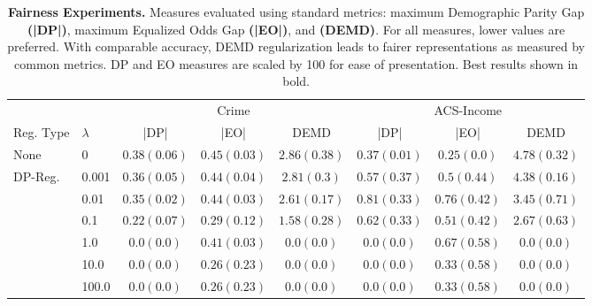 \begin{table*}
	\scriptsize
	\setlength\tabcolsep{10pt} %
	\caption{\footnotesize \textbf{Fairness Experiments.} Measures evaluated using standard metrics: maximum Demographic Parity Gap \textbf{(|DP|)},  maximum Equalized Odds Gap \textbf{(|EO|)}, and \textbf{(DEMD)}. For all measures, lower values are preferred.  With comparable accuracy, DEMD regularization leads to fairer representations as measured by common metrics. DP and EO measures are scaled by 100 for ease of presentation. Best results shown in bold.}
	\begin{tabular*}{\linewidth}{ll| *{3}{c}|*{3}{c}}
		\midrule%
		& & \multicolumn{3}{c}{Crime} & \multicolumn{3}{c}{ACS-Income} \\
		\cmidrule{3-5} \cmidrule{6-8}
		Reg. Type & $\lambda$ & |DP| & |EO| & DEMD & |DP| & |EO| & DEMD \\ 
		\midrule
		None & 0 & $0.38\scriptscriptstyle(0.06)$ & $0.45\scriptscriptstyle(0.03)$ & $2.86\scriptscriptstyle(0.38)$ & $0.37\scriptscriptstyle(0.01)$ & $0.25\scriptscriptstyle(0.0)$ & $4.78\scriptscriptstyle(0.32)$ \\
\midrule
DP-Reg. & 0.001 & $0.36\scriptscriptstyle(0.05)$ & $0.44\scriptscriptstyle(0.04)$ & $2.81\scriptscriptstyle(0.3)$ & $0.57\scriptscriptstyle(0.37)$ & $0.5\scriptscriptstyle(0.44)$ & $4.38\scriptscriptstyle(0.16)$ \\
	 & 0.01 & $0.35\scriptscriptstyle(0.02)$ & $0.44\scriptscriptstyle(0.03)$ & $2.61\scriptscriptstyle(0.17)$ & $0.81\scriptscriptstyle(0.33)$ & $0.76\scriptscriptstyle(0.42)$ & $3.45\scriptscriptstyle(0.71)$ \\
	 & 0.1 & $0.22\scriptscriptstyle(0.07)$ & $0.29\scriptscriptstyle(0.12)$ & $1.58\scriptscriptstyle(0.28)$ & $0.62\scriptscriptstyle(0.33)$ & $0.51\scriptscriptstyle(0.42)$ & $2.67\scriptscriptstyle(0.63)$ \\
	 & 1.0 & $0.0\scriptscriptstyle(0.0)$ & $0.41\scriptscriptstyle(0.03)$ & $0.0\scriptscriptstyle(0.0)$ & $0.0\scriptscriptstyle(0.0)$ & $0.67\scriptscriptstyle(0.58)$ & $0.0\scriptscriptstyle(0.0)$ \\
	 & 10.0 & $0.0\scriptscriptstyle(0.0)$ & $0.26\scriptscriptstyle(0.23)$ & $0.0\scriptscriptstyle(0.0)$ & $0.0\scriptscriptstyle(0.0)$ & $0.33\scriptscriptstyle(0.58)$ & $0.0\scriptscriptstyle(0.0)$ \\
	 & 100.0 & $0.0\scriptscriptstyle(0.0)$ & $0.26\scriptscriptstyle(0.23)$ & $0.0\scriptscriptstyle(0.0)$ & $0.0\scriptscriptstyle(0.0)$ & $0.33\scriptscriptstyle(0.58)$ & $0.0\scriptscriptstyle(0.0)$ \\

\end{tabular*}
\end{table*}
